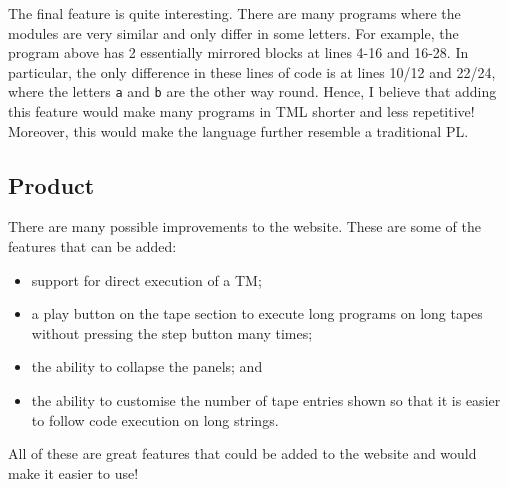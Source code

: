 The final feature is quite interesting. There are many programs where the modules are very similar and only differ in some letters. For example, the program above has 2 essentially mirrored blocks at lines 4-16 and 16-28. In particular, the only difference in these lines of code is at lines 10/12 and 22/24, where the letters \texttt{a} and \texttt{b} are the other way round. Hence, I believe that adding this feature would make many programs in TML shorter and less repetitive! Moreover, this would make the language further resemble a traditional PL.



 \subsection{Product}
There are many possible improvements to the website. These are some of the features that can be added:
\begin{itemize}
    \item support for direct execution of a TM;
    \item a play button on the tape section to execute long programs on long tapes without pressing the step button many times;
    \item the ability to collapse the panels; and
    \item the ability to customise the number of tape entries shown so that it is easier to follow code execution on long strings.
\end{itemize}
All of these are great features that could be added to the website and would make it easier to use!

